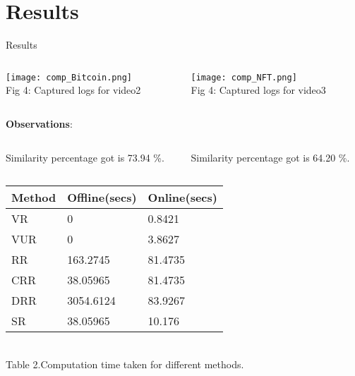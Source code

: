 \documentclass{beamer}
\begin{document}
\section{Results}
\begin{frame}[allowframebreaks]{Results}
    \begin{columns}
        \begin{column}{0.5\textwidth}
            \begin{center}
                \texttt{[image: comp\_Bitcoin.png]} \\
                \footnotesize Fig 4: Captured logs for video2
            \end{center}
        \end{column}
        \begin{column}{0.5\textwidth}
            \begin{center}
                \texttt{[image: comp\_NFT.png]} \\
                \footnotesize Fig 4: Captured logs for video3
            \end{center}
        \end{column}
    \end{columns}
    \textbf{Observations}: \\
    \vspace{0.3em}
    \begin{columns}
        \begin{column}{0.5\textwidth}
            Similarity percentage got is 73.94 \%.
        \end{column}
        \begin{column}{0.5\textwidth}
            Similarity percentage got is 64.20 \%.
        \end{column}
    \end{columns}
    
    \newpage
    
    \begin{center}
        \begin{tabular}{ |p{1.5cm}|p{2cm}|p{2cm}|  }
            \hline
            Method & Offline(secs) & Online(secs) \\
            \hline
            VR & 0 & 0.8421 \\
            VUR & 0 & 3.8627 \\
            RR & 163.2745 & 81.4735 \\
            CRR & 38.05965 & 81.4735 \\
            DRR & 3054.6124 & 83.9267 \\
            SR & 38.05965 & 10.176 \\
            \hline
        \end{tabular} 
        \\ \vspace{0.5cm} Table 2.Computation time taken for different methods.
    \end{center}
\end{frame}
\end{document}
